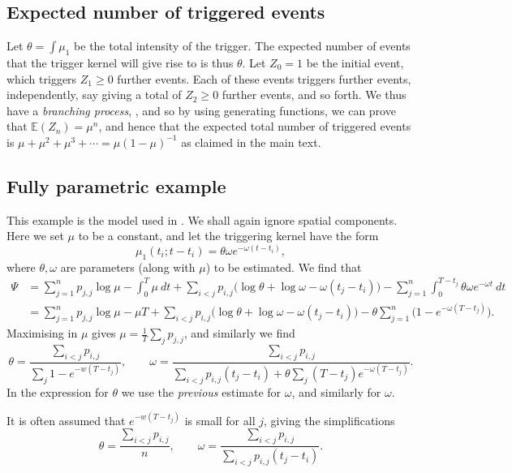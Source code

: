 \documentclass[twoside,a4paper]{article}
\theoremstyle{plain}
\theoremstyle{definition}
\begin{document}
\subsection{Expected number of triggered events}\label{app:gen_func}

Let $\theta = \int \mu_1$ be the total intensity of the trigger.  The expected number of
events that the trigger kernel will give rise to is thus $\theta$.
Let $Z_0=1$ be the initial event, which triggers $Z_1 \geq 0$ further events.  Each of
these events triggers further events, independently, say giving a total of $Z_2\geq 0$
further events, and so forth.  We thus have a \emph{branching process}, \cite[Section~5.4]{gs},
and so by using generating functions, we can prove that $\mathbb E(Z_n) = \mu^n$, and hence
that the expected total number of triggered events is $\mu + \mu^2 + \mu^3 + \cdots
= \mu(1-\mu)^{-1}$ as claimed in the main text.



\subsection{Fully parametric example}\label{app:hawkes_em}

This example is the model used in \cite[Section~2]{lm}.
We shall again ignore spatial components.
Here we set $\mu$ to be a constant, and let the triggering kernel have the form
\[ \mu_1(t_i; t - t_i) = \theta \omega e^{-\omega(t-t_i)}, \]
where $\theta, \omega$ are parameters (along with $\mu$) to be estimated.
We find that
\begin{align*} \Psi &= \sum_{j=1}^n p_{j,j} \log\mu - \int_0^T \mu \ dt
+ \sum_{i<j} p_{i,j} \big( \log\theta + \log\omega - \omega(t_j-t_i) \big)
- \sum_{j=1}^n \int_0^{T-t_j} \theta \omega e^{-\omega t} \ dt \\
&= \sum_{j=1}^n p_{j,j} \log\mu - \mu T
+ \sum_{i<j} p_{i,j} \big( \log\theta + \log\omega - \omega(t_j-t_i) \big)
- \theta \sum_{j=1}^n \big(1 - e^{-\omega (T-t_j)}\big).
\end{align*}
Maximising in $\mu$ gives $\mu = \frac{1}{T} \sum_j p_{j,j}$, and similarly we find
\[ \theta = \frac{\sum_{i<j} p_{i,j}}{\sum_j 1 - e^{-w(T-t_j)}}, \qquad
\omega = \frac{\sum_{i<j} p_{i,j}}{\sum_{i<j} p_{i,j} (t_j-t_i) + \theta\sum_j (T-t_j)e^{-\omega(T-t_j)}}. \]
In the expression for $\theta$ we use the \emph{previous} estimate for $\omega$, and similarly
for $\omega$.

It is often assumed that $e^{-w(T-t_j)}$ is small for all $j$, giving the simplifications
\[ \theta = \frac{\sum_{i<j} p_{i,j}}{n}, \qquad
\omega = \frac{\sum_{i<j} p_{i,j}}{\sum_{i<j} p_{i,j} (t_j-t_i)}. \]
\end{document}
